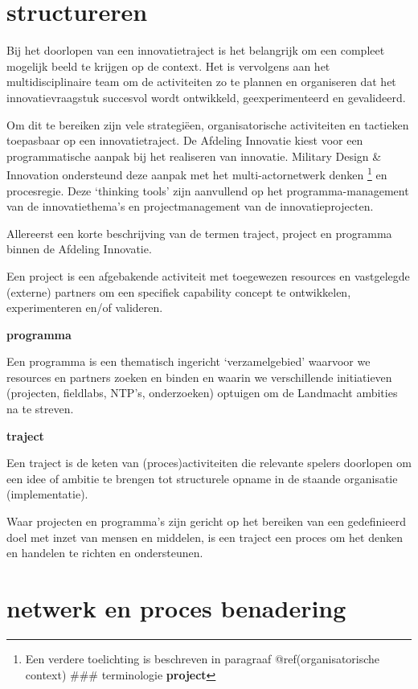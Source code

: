 \documentclass[
]{book}
\begin{document}
\hypertarget{structureren}{%
\section{structureren}\label{structureren}}

Bij het doorlopen van een innovatietraject is het belangrijk om een compleet mogelijk beeld te krijgen op de context. Het is vervolgens aan het multidisciplinaire team om de activiteiten zo te plannen en organiseren dat het innovatievraagstuk succesvol wordt ontwikkeld, geexperimenteerd en gevalideerd.

Om dit te bereiken zijn vele strategiëen, organisatorische activiteiten en tactieken toepasbaar op een innovatietraject. De Afdeling Innovatie kiest voor een programmatische aanpak bij het realiseren van innovatie. Military Design \& Innovation ondersteund deze aanpak met het multi-actornetwerk denken \footnote{Een verdere toelichting is beschreven in paragraaf @ref(organisatorische context)
  \#\#\# terminologie
  \textbf{project}} en procesregie. Deze `thinking tools' zijn aanvullend op het programma-management van de innovatiethema's en projectmanagement van de innovatieprojecten.

Allereerst een korte beschrijving van de termen traject, project en programma binnen de Afdeling Innovatie.

Een project is een afgebakende activiteit met toegewezen resources en vastgelegde (externe) partners om een specifiek capability concept te ontwikkelen, experimenteren en/of valideren.

\textbf{programma}

Een programma is een thematisch ingericht `verzamelgebied' waarvoor we resources en partners zoeken en binden en waarin we verschillende initiatieven (projecten, fieldlabs, NTP's, onderzoeken) optuigen om de Landmacht ambities na te streven.

\textbf{traject}

Een traject is de keten van (proces)activiteiten die relevante spelers doorlopen om een idee of ambitie te brengen tot structurele opname in de staande organisatie (implementatie).

Waar projecten en programma's zijn gericht op het bereiken van een gedefinieerd doel met inzet van mensen en middelen, is een traject een proces om het denken en handelen te richten en ondersteunen.

\hypertarget{netwerk-en-proces-benadering}{%
\section{netwerk en proces benadering}\label{netwerk-en-proces-benadering}}
\end{document}
